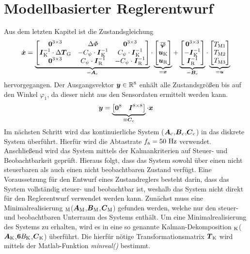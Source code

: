 \section{Modellbasierter Reglerentwurf}
Aus dem letzten Kapitel ist die Zustandsgleichung
\begin{equation}
\dot{\boldsymbol{x}} = \underbrace{\begin{bmatrix}
\boldsymbol{0}^{3\times 3} & \Delta\varPhi & \boldsymbol{0}^{3\times 3} 
\\
\boldsymbol{I}_{\text{K}}^{-1}\cdot\Delta\boldsymbol{T}_{\text{G}} & -C_{\psi}\cdot\boldsymbol{I}^{-1}_{\text{K}} & C_{\psi}\cdot\boldsymbol{I}^{-1}_{\text{K}}
\\
\boldsymbol{0}^{3\times 3} & C_{\psi}\cdot\boldsymbol{I}^{-1}_{\text{R}} & -C_{\psi}\cdot\boldsymbol{I}^{-1}_{\text{R}}
\end{bmatrix}}_{=\boldsymbol{A}_{\text{c}}} \cdot \underbrace{\begin{bmatrix}
\boldsymbol{\overline{\varphi}} 
\\
\boldsymbol{u}_{\text{K}} \\
\boldsymbol{u}_{\text{R}}
\end{bmatrix}}_{=\boldsymbol{x}}
+
\underbrace{\begin{bmatrix}
\boldsymbol{0}^{3\times 3}
\\
-\boldsymbol{I}^{-1}_{\text{K}}
\\
\boldsymbol{I}^{-1}_{\text{R}}
\end{bmatrix}}_{=\boldsymbol{B}_{\text{c}}}\cdot \underbrace{\begin{bmatrix}
T_{\text{M1}} \\ T_{\text{M2}} \\ T_{\text{M3}}
\end{bmatrix}}_{=\boldsymbol{u}}
\end{equation}
hervorgegangen. Der Ausgangsvektor $\boldsymbol{y}\in \mathbb{R}^8$ enhält alle Zustandsgrößen bis auf den Winkel $\varphi_1$, da dieser nicht aus den Sensordaten ermittelt werden kann.
\begin{equation}
\boldsymbol{y} = \underbrace{\begin{bmatrix}
\boldsymbol{0}^8 & \boldsymbol{I}^{8\times 8}
\end{bmatrix}}_{\equiv \boldsymbol{C}_{\text{c}}} \cdot \boldsymbol{x}
\end{equation}
Im nächsten Schritt wird das kontinuierliche System ($\boldsymbol{A}_{\text{c}}$,$\boldsymbol{B}_{\text{c}}$,$\boldsymbol{C}_{\text{c}}$) in das diskrete System  überführt. Hierfür wird die Abtastrate $f_{\text{a}} = 50\text{ Hz}$ verwendet.
Anschließend wird das System mittels der Kalmankriterien auf Steuer- und Beobachtbarkeit geprüft. Hieraus folgt, dass das System sowohl über einen nicht steuerbaren als auch einen nicht beobachtbaren Zustand verfügt. Eine Voraussetzung für den Entwurf eines Zustandreglers besteht darin, dass das System vollständig steuer- und beobachtbar ist, weshalb das System  nicht direkt für den Reglerentwurf verwendet werden kann. Zunächst muss eine Minimalrealisierung $_{\text{M}}$($\boldsymbol{A}_{\text{M}}$,$\boldsymbol{B}_{\text{M}}$,$\boldsymbol{C}_{\text{M}}$) gefunden werden, welche nur den steuer- und beobachtbaren Unterraum des Systems enthält. Um eine Minimalrealisierung des Systems zu erhalten, wird es in eine so genannte Kalman-Dekomposition $_{\text{K}}$($\boldsymbol{A}_{\text{K}}$,$\boldsymbol{6}{B}_{\text{K}}$,$\boldsymbol{C}_{\text{K}}$) überführt. Die hierfür nötige Transformationsmatrix $\boldsymbol{T}_{\text{K}}$ wird mittels der Matlab-Funktion \textit{minreal()} bestimmt.
